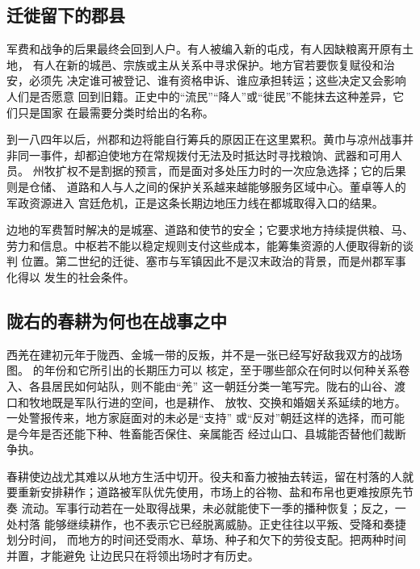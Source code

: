 \subsection{迁徙留下的郡县}

军费和战争的后果最终会回到人户。有人被编入新的屯戍，有人因缺粮离开原有土地，
有人在新的城邑、宗族或主从关系中寻求保护。地方官若要恢复赋役和治安，必须先
决定谁可被登记、谁有资格申诉、谁应承担转运；这些决定又会影响人们是否愿意
回到旧籍。正史中的“流民”“降人”或“徙民”不能抹去这种差异，它们只是国家
在最需要分类时给出的名称。

到一八四年以后，州郡和边将能自行筹兵的原因正在这里累积。黄巾与凉州战事并
非同一事件，却都迫使地方在常规拨付无法及时抵达时寻找粮饷、武器和可用人员。
州牧扩权不是割据的预言，而是面对多处压力时的一次应急选择；它的后果则是仓储、
道路和人与人之间的保护关系越来越能够服务区域中心。董卓等人的军政资源进入
宫廷危机，正是这条长期边地压力线在都城取得入口的结果。

\begin{turningpoint}[边防为何改变了地方政治]
边地的军费暂时解决的是城塞、道路和使节的安全；它要求地方持续提供粮、马、
劳力和信息。中枢若不能以稳定规则支付这些成本，能筹集资源的人便取得新的谈判
位置。第二世纪的迁徙、塞市与军镇因此不是汉末政治的背景，而是州郡军事化得以
发生的社会条件。
\end{turningpoint}

\subsection{陇右的春耕为何也在战事之中}

西羌在建初元年于陇西、金城一带的反叛，并不是一张已经写好敌我双方的战场图。
的年份和它所引出的长期压力可以
核定，至于哪些部众在何时以何种关系卷入、各县居民如何站队，则不能由“羌”
这一朝廷分类一笔写完。陇右的山谷、渡口和牧地既是军队行进的空间，也是耕作、
放牧、交换和婚姻关系延续的地方。一处警报传来，地方家庭面对的未必是“支持”
或“反对”朝廷这样的选择，而可能是今年是否还能下种、牲畜能否保住、亲属能否
经过山口、县城能否替他们裁断争执。

春耕使边战尤其难以从地方生活中切开。役夫和畜力被抽去转运，留在村落的人就
要重新安排耕作；道路被军队优先使用，市场上的谷物、盐和布帛也更难按原先节奏
流动。军事行动若在一处取得战果，未必就能使下一季的播种恢复；反之，一处村落
能够继续耕作，也不表示它已经脱离威胁。正史往往以平叛、受降和奏捷划分时间，
而地方的时间还受雨水、草场、种子和欠下的劳役支配。把两种时间并置，才能避免
让边民只在将领出场时才有历史。

